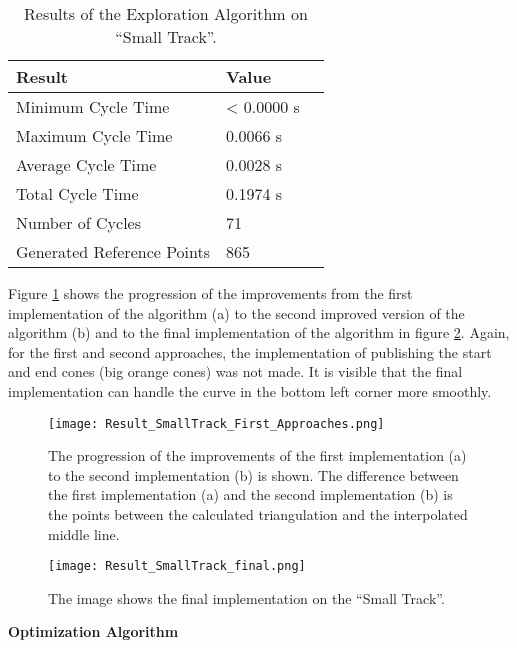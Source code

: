 \begin{table}[H]
    \centering
    \begin{tabular}{|l|l|l|}
        \hline
        \textbf{Result}            & \textbf{Value} \\ \hline
        Minimum Cycle Time         & < 0.0000 s     \\ \hline
        Maximum Cycle Time         & 0.0066 s       \\ \hline
        Average Cycle  Time        & 0.0028 s       \\ \hline
        Total Cycle Time           & 0.1974 s       \\ \hline
        Number of Cycles           & 71             \\ \hline
        Generated Reference Points & 865            \\ \hline
    \end{tabular}
    \caption{Results of the Exploration Algorithm on ``Small Track''.}
    \label{tab:Results Small Track Exploration}
\end{table}

Figure \ref{fig:Result Small Track First Approaches} shows the progression of the improvements from the first implementation of the algorithm (a) to the second improved version of the algorithm (b) and to the final implementation of the algorithm in figure \ref{fig:Result Small Track Final}. Again, for the first and second approaches, the implementation of publishing the start and end cones (big orange cones) was not made. It is visible that the final implementation can handle the curve in the bottom left corner more smoothly.
\begin{figure}[H]
    \centering
    \texttt{[image: Result\_SmallTrack\_First\_Approaches.png]}
    \caption{The progression of the improvements of the first implementation (a) to the second implementation (b) is shown. The difference between the first implementation (a) and the second implementation (b) is the points between the calculated triangulation and the interpolated middle line.}
    \label{fig:Result Small Track First Approaches}
\end{figure}
\begin{figure}[H]
    \centering
    \texttt{[image: Result\_SmallTrack\_final.png]}
    \caption{The image shows the final implementation on the ``Small Track''.}
    \label{fig:Result Small Track Final}
\end{figure}

\textbf{Optimization Algorithm}

